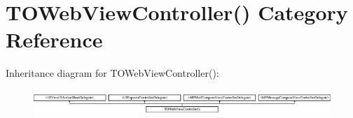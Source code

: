 \hypertarget{category_t_o_web_view_controller_07_08}{}\section{T\+O\+Web\+View\+Controller() Category Reference}
\label{category_t_o_web_view_controller_07_08}
Inheritance diagram for T\+O\+Web\+View\+Controller()\+:\begin{figure}[H]
\begin{center}
\leavevmode
\includegraphics[height=0.965517cm]{category_t_o_web_view_controller_07_08}
\end{center}
\end{figure}
